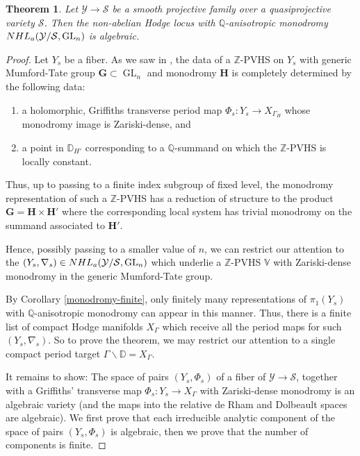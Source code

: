 \documentclass[10pt,letterpaper,english,reqno]{amsart}
\numberwithin{equation}{subsection}
\newcommand\cS{{\mathcal S}}
\newcommand\cY{{\mathcal Y}}
\newcommand\bD{{\mathbb D}}
\newcommand\Q{{\mathbb Q}}
\newcommand\bV{{\mathbb V}}
\newcommand\Z{{\mathbb Z}}
\newcommand\bfG{{\mathbf G}}
\newcommand\bfH{{\mathbf H}}
\DeclareMathOperator{\GL}{GL}
\newtheorem{theorem}{Theorem}[section]
\theoremstyle{definition}
\begin{document}
\begin{theorem} Let $\cY\to \cS$ be a smooth projective
family over a quasiprojective variety $\cS$. Then
the non-abelian Hodge locus with $\Q$-anisotropic monodromy ${\rm NHL}_a(\cY/\cS,\GL_n)$ is algebraic.
\end{theorem}

 \begin{proof} 
Let $Y_s$ be a fiber. As we saw in , the data of a $\Z$-PVHS on $Y_s$ with generic Mumford-Tate group $\bfG\subset \GL_n$ and monodromy $\bfH$ is completely 
determined by the following data:
\begin{enumerate}
    \item a holomorphic, Griffiths transverse period map $\Phi_s:Y_s\rightarrow X_{\Gamma_H}$ whose monodromy image is Zariski-dense, and
    \item a point in $\bD_{H'}$ corresponding to a
    $\Q$-summand on which the $\Z$-PVHS is locally constant. 
\end{enumerate}

Thus, up to passing to a finite index subgroup
of fixed level, the monodromy representation
of such a $\Z$-PVHS has a reduction
of structure to the product
$\bfG = \bfH\times \bfH'$ where the corresponding
local system has trivial monodromy
on the summand associated to $\bfH'$.

Hence, possibly passing to a smaller value of $n$,
we can restrict our attention to the 
$(Y_s,\nabla_s)\in {\rm NHL}_a(\cY/\cS,\GL_n)$ which
underlie a $\Z$-PVHS $\bV$ with Zariski-dense monodromy
in the generic Mumford-Tate group.

By Corollary \ref{monodromy-finite},
only finitely many representations of $\pi_1(Y_s)$ with $\Q$-anisotropic monodromy
can appear in this manner. Thus, there is 
a finite list of compact Hodge manifolds $X_\Gamma$ which
receive all the period maps for such $(Y_s,\nabla_s)$.
So to prove the theorem,
we may restrict our attention to a single compact period
target $\Gamma\backslash \bD=X_\Gamma$.

It remains to show: The space of pairs 
$(Y_s,\Phi_s)$ of a fiber of $\cY\to \cS$, together with a 
Griffiths' transverse map $\Phi_s \colon Y_s\to X_\Gamma$
with Zariski-dense monodromy is an algebraic variety (and the maps into the 
relative de Rham and Dolbeault spaces are algebraic).
We first prove that each irreducible analytic
component of the space of pairs $(Y_s,\Phi_s)$ is algebraic, then we prove that the number of components is finite.
 

\end{proof}
\end{document}
